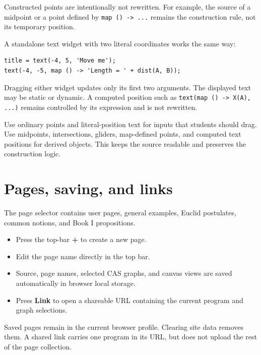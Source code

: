 \documentclass[11pt,a4paper]{article}
\newcommand{\ui}[1]{\textsf{\textbf{#1}}}
\newcommand{\code}[1]{\texttt{#1}}
\begin{document}
Constructed points are intentionally not rewritten. For example, the source of a midpoint or a point defined by \code{map () -> ...} remains the construction rule, not its temporary position.

A standalone text widget with two literal coordinates works the same way:

\begin{lstlisting}[style=jessie]
title = text(-4, 5, 'Move me');
text(-4, -5, map () -> 'Length = ' + dist(A, B));
\end{lstlisting}

Dragging either widget updates only its first two arguments. The displayed text may be static or dynamic. A computed position such as \code{text(map () -> X(A), ...)} remains controlled by its expression and is not rewritten.

\begin{tipbox}
Use ordinary points and literal-position text for inputs that students should drag. Use midpoints, intersections, gliders, map-defined points, and computed text positions for derived objects. This keeps the source readable and preserves the construction logic.
\end{tipbox}

\section{Pages, saving, and links}

The page selector contains user pages, general examples, Euclid postulates, common notions, and Book I propositions.

\begin{itemize}
  \item Press the top-bar \ui{+} to create a new page.
  \item Edit the page name directly in the top bar.
  \item Source, page names, selected CAS graphs, and canvas views are saved automatically in browser local storage.
  \item Press \ui{Link} to open a shareable URL containing the current program and graph selections.
\end{itemize}

\begin{notebox}
Saved pages remain in the current browser profile. Clearing site data removes them. A shared link carries one program in its URL, but does not upload the rest of the page collection.
\end{notebox}
\end{document}
